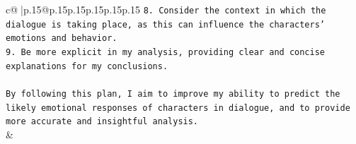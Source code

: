\documentclass{article}
\begin{document}
{\begin{supertabular}{c@{$\;$}|p{.15\linewidth}@{}p{.15\linewidth}p{.15\linewidth}p{.15\linewidth}p{.15\linewidth}p{.15\linewidth}}
{{{\texttt{8. Consider the context in which the dialogue is taking place, as this can influence the characters' emotions and behavior.} \\
\texttt{9. Be more explicit in my analysis, providing clear and concise explanations for my conclusions.} \\
\\ 
\texttt{By following this plan, I aim to improve my ability to predict the likely emotional responses of characters in dialogue, and to provide more accurate and insightful analysis.} \\
            }
        }
    }
    & \\ \\

\end{supertabular}
}
\end{document}
